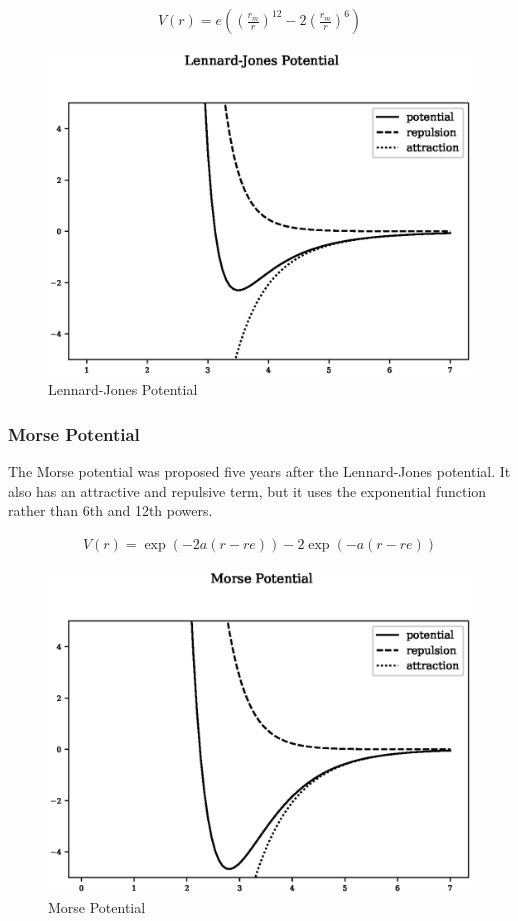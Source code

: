 \begin{equation}
\begin{split}
V(r) = e \left(\left(\frac{r_m}{r}\right)^{12} - 2 \left(\frac{r_m}{r}\right)^6\right)
\end{split}
\label{eq:eqLennardJones}
\end{equation}

\begin{figure}[!htbp]
  \begin{center}
    \includegraphics[width=.5\linewidth]{chapters/background_potential_fitting/plots/lennard_jones.eps}
    \caption{Lennard-Jones Potential}
    \label{graph:lennardjonespot}
  \end{center}
\end{figure}



\FloatBarrier
\subsubsection{Morse Potential}
\label{section:Morse}

The Morse potential was proposed five years after the Lennard-Jones potential.  It also has an attractive and repulsive term, but it uses the exponential function rather than 6th and 12th powers.

\begin{equation}
\begin{split}
V(r) = \exp(-2 a (r - re)) - 2 \exp (-a(r - re))
\end{split}
\label{eq:eqLennardJones}
\end{equation}

\begin{figure}[!htbp]
  \begin{center}
    \includegraphics[width=.5\linewidth]{chapters/background_potential_fitting/plots/morse.eps}
    \caption{Morse Potential}
    \label{graph:morsepot}
  \end{center}
\end{figure}



